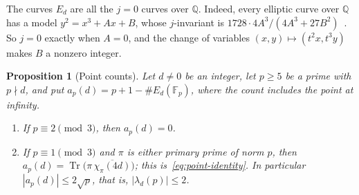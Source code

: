 \documentclass[11pt]{article}
\numberwithin{equation}{section}
\newcommand{\Tr}{\operatorname{Tr}}
\newtheorem{proposition}{Proposition}
\begin{document}
The curves $E_d$ are all the $j=0$ curves over $\mathbb Q$. Indeed, every elliptic curve over $\mathbb Q$ has a model
$y^2=x^3+Ax+B$, whose $j$-invariant is $1728\cdot4A^3/(4A^3+27B^2)$~\cite[Chapter~III]{SilAEC}. So $j=0$ exactly when $A=0$, and the change of
variables $(x,y)\mapsto(t^2x,t^3y)$ makes $B$ a nonzero integer.

\begin{proposition}[Point counts]\label{prop:b1-points}
Let $d\ne0$ be an integer, let $p\ge5$ be a prime with $p\nmid d$, and put $a_p(d)=p+1-\#E_d(\mathbb F_p)$, where the
count includes the point at infinity.
\begin{enumerate}
\item[(a)] If $p\equiv2\pmod3$, then $a_p(d)=0$.
\item[(b)] If $p\equiv1\pmod3$ and $\pi$ is either primary prime of norm $p$, then
 $a_p(d)=\Tr\bigl(\pi\,\overline{\chi_\pi(4d)}\bigr)$; this is~\eqref{eq:point-identity}. In particular
 $|a_p(d)|\le2\sqrt p$, that is, $|\lambda_d(p)|\le2$.
\end{enumerate}
\end{proposition}
\end{document}
